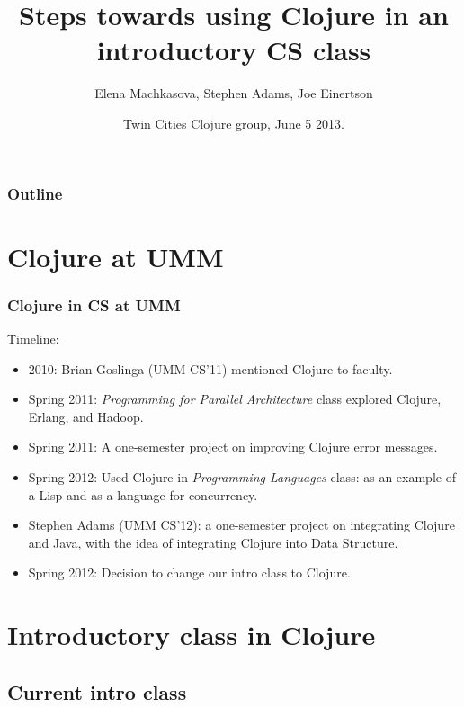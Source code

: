 \documentclass{beamer}
\begin{document}
\title{Steps towards using Clojure in an introductory CS class}
\author{Elena Machkasova, Stephen Adams, Joe Einertson}
\date[]  
{ Twin Cities Clojure group, June 5 2013.}

\begin{frame}
  \titlepage
\end{frame}

\begin{frame}

  \frametitle{Outline}
\tableofcontents
\end{frame}


\section{Clojure at UMM}

\begin{frame}
  \frametitle{Clojure in CS at UMM}
Timeline: 
\begin{itemize}
\item 2010: Brian Goslinga (UMM CS'11) mentioned Clojure to faculty.
\item Spring 2011: {\it Programming for Parallel Architecture} class explored Clojure, Erlang, and Hadoop. 
\item Spring 2011:  A one-semester project on improving Clojure error messages. 
\item Spring 2012: Used Clojure in {\it Programming Languages} class: as an example of a Lisp and as a language for concurrency.  
\item Stephen Adams (UMM CS'12): a one-semester project on integrating Clojure and Java, with the idea of integrating Clojure into Data Structure. %
\item Spring 2012: Decision to change our intro class to Clojure. %
\end{itemize}
\end{frame}


\section{Introductory class in Clojure}

\subsection{Current intro class}
\end{document}
